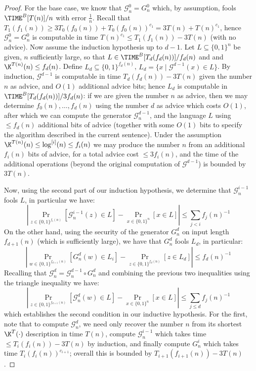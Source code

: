 \documentclass[11pt]{article}
\newcommand{\B}{\{0,1\}}
\begin{document}
\begin{proof}
For the base case, we know that $\mathcal{G}^0_n = G^0_n$ which, by assumption, fools $\TIME^B[T(n)]/n$ with error $\frac{1}{n}$. Recall that $T_1(f_1(n))  \geq  3T_0(f_0(n)) + T_0(f_0(n))^{c_1} = 3T(n) + T(n)^{c_1}$, hence $\mathcal{G}^0_n = G^0_n$ is computable in time $T(n)^{c_1}  \leq  T_1(f_1(n)) - 3T(n)$ (with no advice).
Now assume the induction hypothesis up to $d-1$. Let $L \subseteq \B^n$ be given, $n$ sufficiently large, so that $L \in \TIME^B[T_d(f_d(n))]/f_d(n)$ and and $\K^{T(n)}(n) \leq f_d(n)$.
Define $L_d \subseteq \B^{f_d(n)}$, $L_d = \{ x \mid \mathcal{G}^{d-1}(x) \in L\}$. By induction, $\mathcal{G}^{d-1}$ is computable in time $T_{d}(f_d(n)) - 3T(n)$ given the number $n$ as advice, and $O(1)$ additional advice bits; hence $L_d$ is computable in $\TIME^B[T_{d}(f_d(n))]/3f_d(n)$: if we are given the number $n$ as advice, then we may determine $f_0(n),\ldots,f_{d}(n)$ using the number $d$ as advice which costs $O(1)$, after which we can compute the generator $\mathcal{G}^{d-1}_n$, and the language $L$ using $\leq f_d(n)$ additional bits of advice (together with some $O(1)$ bits to specify the algorithm described in the current sentence). Under the assumption $\K^{T(n)}(n) \leq \log^{[i]}(n) \leq f_i(n)$ we may produce the number $n$ from an additional $f_i(n)$ bits of advice, for a total advice cost $\leq 3 f_i(n)$, and the time of the additional operations (beyond the original computation of $\mathcal{G}^{d-1}$) is bounded by $3T(n)$.

Now, using the second part of our induction hypothesis, we determine that $\mathcal{G}_n^{i-1}$ fools $L$, in particular we have:
\[
|\Pr_{z \in \B^{f_i(n)}}[\mathcal{G}^{i-1}_n(z) \in L] - \Pr_{x \in \B^{n}}[x \in L] | \leq \sum_{j < i} f_j(n)^{-1}
\]
On the other hand, using the security of the generator $G^d_n$ on input length $f_{d+1}(n)$ (which is sufficiently large), we have that $G^d_n$ fools $L_d$, in particular:
\[
|\Pr_{w \in \B^{f_{d+1}(n)}}[G^d_n(w) \in L_i] - \Pr_{z \in \B^{f_{d}(n)}}[z \in L_d] | \leq f_{d}(n)^{-1}
\]
Recalling that $\mathcal{G}^{d}_n = \mathcal{G}^{d-1}_n \circ G^d_n$ and combining the previous two inequalities using the triangle inequality we have:
\[
|\Pr_{z \in \B^{f_{d+1}(n)}}[\mathcal{G}^{d}_n (w) \in L] - \Pr_{x \in \B^{n}}[x\in L] | \leq \sum_{j \leq  d} f_j(n)^{-1}
\]
which establishes the second condition in our inductive hypothesis. For the first, note that to compute $\mathcal{G}^{d}_n$, we need only recover the number $n$ from its shortest $\K^{T}(\cdot)$ description in time $T(n)$, compute $\mathcal{G}^{i-1}_n$ which takes time $\leq T_{i}(f_i(n)) - 3T(n)$ by induction, and finally compute $G^i_n$ which takes time $T_i(f_i(n))^{c_{i+1}}$; overall this is bounded by $T_{i+1}(f_{i+1}(n)) - 3T(n)$.


\end{proof}
\end{document}
